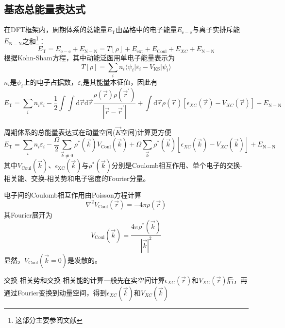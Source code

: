 {\subsection{基态总能量表达式}
在DFT框架内，周期体系的总能量$E_{\mathrm{T}}$由晶格中的电子能量$E_{\mathrm{e-e}}$与离子实排斥能$E_{\mathrm{N-N}}$之和\footnote{这部分主要参阅文献}：
	\begin{equation}
		E_{\mathrm{T}}=E_{\mathrm{e-e}}+E_{\mathrm{N-N}}=T[\rho]+E_{\mathrm{ext}}+E_{\mathrm{Coul}}+E_{XC}+E_{\mathrm{N-N}}
	\end{equation}
根据\textrm{Kohn-Sham}方程，其中动能泛函用单电子能量表示为
\begin{equation}
	T[{\rho}]=\sum_in_i\langle\psi_i|\varepsilon_i-V_{\mathrm{KS}}|\psi_i\rangle
\end{equation}
$n_i$是$\psi_i$上的电子占据数，$\varepsilon_i$是其能量本征值，因此有
\begin{equation}
	E_{\mathrm{T}}=\sum_in_i\varepsilon_i-\dfrac12\int\int\mathrm{d}\vec r\mathrm{d}\vec r\dfrac{\rho(\vec r)\rho(\vec r^{\prime})}{|\vec r-\vec r^{\prime}|}+\int\mathrm{d}\vec r\rho(\vec r)[\epsilon_{XC}(\vec r)-V_{XC}(\vec r)]+E_{\mathrm{N-N}}
	\label{eq:PP_TOT_R}
\end{equation}

周期体系的总能量表达式在动量空间($\vec K$空间)计算更方便
\begin{equation}
	E_{\mathrm{T}}=\sum_in_i\varepsilon_i-\dfrac{\Omega}2\sum_{\vec k\neq 0}\rho^{\ast}(\vec k)V_{\mathrm{Coul}}(\vec k)+\Omega\sum_{\vec k}\rho^{\ast}(\vec k)[\epsilon_{XC}(\vec k)-V_{XC}(\vec k)]+E_{\mathrm{N-N}}
\end{equation}
其中$V_{\mathrm{Coul}}(\vec k)$、$\epsilon_{\mathrm{XC}}(\vec k)$与$\rho^{\ast}(\vec k)$分别是\textrm{Coulomb}相互作用、单个电子的交换-相关能、交换-相关势和电子密度的\textrm{Fourier}分量。

电子间的\textrm{Coulomb}相互作用由\textrm{Poisson}方程计算
\begin{equation}
	\nabla^2V_{\mathrm{Coul}}(\vec r)=-4\pi\rho(\vec r)
\end{equation}
其\textrm{Fourier}展开为
\begin{equation}
	V_{\mathrm{Coul}}(\vec k)=\dfrac{4\pi\rho^{\ast}(\vec k)}{|\vec k|^2}
\end{equation}
显然，$V_{\mathrm{Coul}}(\vec k=0)$是发散的。

交换-相关势和交换-相关能的计算一般先在实空间计算$\epsilon_{XC}(\vec r)$和$V_{XC}(\vec r)$后，再通过\textrm{Fourier}变换到动量空间，得到$\epsilon_{XC}(\vec k)$和$V_{XC}(\vec k)$

}
